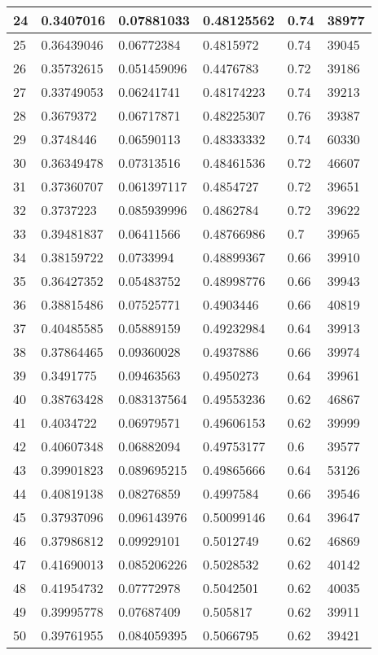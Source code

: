 \begin{longtable}{|l|l|l|l|l|l|}
24 & 0.3407016 & 0.07881033 & 0.48125562 & 0.74 & 38977 \\ \hline 
25 & 0.36439046 & 0.06772384 & 0.4815972 & 0.74 & 39045 \\ \hline 
26 & 0.35732615 & 0.051459096 & 0.4476783 & 0.72 & 39186 \\ \hline 
27 & 0.33749053 & 0.06241741 & 0.48174223 & 0.74 & 39213 \\ \hline 
28 & 0.3679372 & 0.06717871 & 0.48225307 & 0.76 & 39387 \\ \hline 
29 & 0.3748446 & 0.06590113 & 0.48333332 & 0.74 & 60330 \\ \hline 
30 & 0.36349478 & 0.07313516 & 0.48461536 & 0.72 & 46607 \\ \hline 
31 & 0.37360707 & 0.061397117 & 0.4854727 & 0.72 & 39651 \\ \hline 
32 & 0.3737223 & 0.085939996 & 0.4862784 & 0.72 & 39622 \\ \hline 
33 & 0.39481837 & 0.06411566 & 0.48766986 & 0.7 & 39965 \\ \hline 
34 & 0.38159722 & 0.0733994 & 0.48899367 & 0.66 & 39910 \\ \hline 
35 & 0.36427352 & 0.05483752 & 0.48998776 & 0.66 & 39943 \\ \hline 
36 & 0.38815486 & 0.07525771 & 0.4903446 & 0.66 & 40819 \\ \hline 
37 & 0.40485585 & 0.05889159 & 0.49232984 & 0.64 & 39913 \\ \hline 
38 & 0.37864465 & 0.09360028 & 0.4937886 & 0.66 & 39974 \\ \hline 
39 & 0.3491775 & 0.09463563 & 0.4950273 & 0.64 & 39961 \\ \hline 
40 & 0.38763428 & 0.083137564 & 0.49553236 & 0.62 & 46867 \\ \hline 
41 & 0.4034722 & 0.06979571 & 0.49606153 & 0.62 & 39999 \\ \hline 
42 & 0.40607348 & 0.06882094 & 0.49753177 & 0.6 & 39577 \\ \hline 
43 & 0.39901823 & 0.089695215 & 0.49865666 & 0.64 & 53126 \\ \hline 
44 & 0.40819138 & 0.08276859 & 0.4997584 & 0.66 & 39546 \\ \hline 
45 & 0.37937096 & 0.096143976 & 0.50099146 & 0.64 & 39647 \\ \hline 
46 & 0.37986812 & 0.09929101 & 0.5012749 & 0.62 & 46869 \\ \hline 
47 & 0.41690013 & 0.085206226 & 0.5028532 & 0.62 & 40142 \\ \hline 
48 & 0.41954732 & 0.07772978 & 0.5042501 & 0.62 & 40035 \\ \hline 
49 & 0.39995778 & 0.07687409 & 0.505817 & 0.62 & 39911 \\ \hline 
50 & 0.39761955 & 0.084059395 & 0.5066795 & 0.62 & 39421 \\ \hline 
\end{longtable}